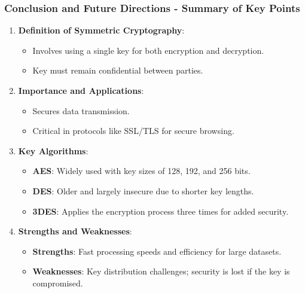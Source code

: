 \documentclass{beamer}
\begin{document}
\begin{frame}[fragile]
    \frametitle{Conclusion and Future Directions - Summary of Key Points}
    \begin{enumerate}
        \item \textbf{Definition of Symmetric Cryptography}:
        \begin{itemize}
            \item Involves using a single key for both encryption and decryption.
            \item Key must remain confidential between parties.
        \end{itemize}
        
        \item \textbf{Importance and Applications}:
        \begin{itemize}
            \item Secures data transmission.
            \item Critical in protocols like SSL/TLS for secure browsing.
        \end{itemize}
        
        \item \textbf{Key Algorithms}:
        \begin{itemize}
            \item \textbf{AES}: Widely used with key sizes of 128, 192, and 256 bits.
            \item \textbf{DES}: Older and largely insecure due to shorter key lengths.
            \item \textbf{3DES}: Applies the encryption process three times for added security.
        \end{itemize}
        
        \item \textbf{Strengths and Weaknesses}:
        \begin{itemize}
            \item \textbf{Strengths}: Fast processing speeds and efficiency for large datasets.
            \item \textbf{Weaknesses}: Key distribution challenges; security is lost if the key is compromised.
        \end{itemize}
    \end{enumerate}
\end{frame}
\end{document}
